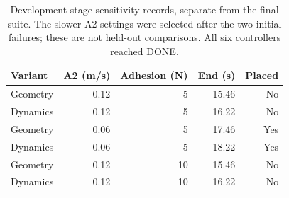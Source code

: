 \begin{table}[t]
\centering\small
\caption{Development-stage sensitivity records, separate from the final suite. The slower-A2 settings were selected after the two initial failures; these are not held-out comparisons. All six controllers reached DONE.}
\label{tab:development}
\begin{tabular}{@{}lrrrr@{}}\toprule
Variant & A2 (m/s) & Adhesion (N) & End (s) & Placed\\\midrule
Geometry & 0.12 & 5 & 15.46 & No\\
Dynamics & 0.12 & 5 & 16.22 & No\\
Geometry & 0.06 & 5 & 17.46 & Yes\\
Dynamics & 0.06 & 5 & 18.22 & Yes\\
Geometry & 0.12 & 10 & 15.46 & No\\
Dynamics & 0.12 & 10 & 16.22 & No\\
\bottomrule\end{tabular}
\end{table}